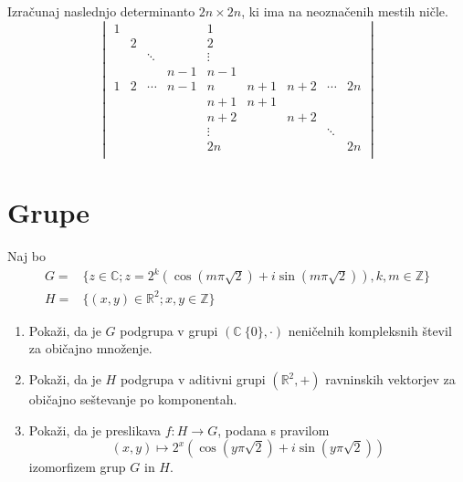 \documentclass[a4paper,12pt]{article}
\begin{document}
Izračunaj naslednjo determinanto \(2n \times 2n\), ki ima na neoznačenih mestih ničle.
\[
\begin{vmatrix}
    
    1 & & & & 1 & & & & \\
    & 2 & & & 2 & & & & \\
    & & \ddots & & \vdots & &  \\
    & & & n-1 & n-1 & & & & \\
    1 & 2 & \cdots & n-1  & n  & n+1  & n+2 & \cdots & 2n \\
    & & & & n+1 & n+1 & & & \\
    & & & & n+2 & & n+2 & &\\ 
    & & & & \vdots & & & \ddots & \\
    & & & & 2n & & & & 2n \\
    
\end{vmatrix}
\]
\section*{Grupe}

Naj bo \begin{align*}
G =& \{z \in \mathbb{C}; z=2^k (\cos (m \pi \sqrt{2}) + i \sin (m \pi \sqrt{2})), k,m \in \mathbb{Z}\} \\
H =& \{(x,y) \in \mathbb{R}^2 ; x,y \in \mathbb{Z}\}  
\end{align*}

\begin{enumerate}
\item
Pokaži, da je \(G\) podgrupa v grupi \((\mathbb{C} \ \{0\}, \cdot ) \)
neničelnih kompleksnih števil za običajno množenje.

\item
Pokaži, da je \(H\) podgrupa v aditivni grupi \((\mathbb{R}^2 , + )\)
ravninskih vektorjev za običajno seštevanje po komponentah.

\item
Pokaži, da je preslikava \(f:H\to G\), podana s pravilom
\[
(x,y) \mapsto 2^x (\cos (y \pi \sqrt{2}) + i \sin (y \pi \sqrt{2}))
\]
izomorfizem grup \(G\) in \(H\).
\end{enumerate}
\end{document}
